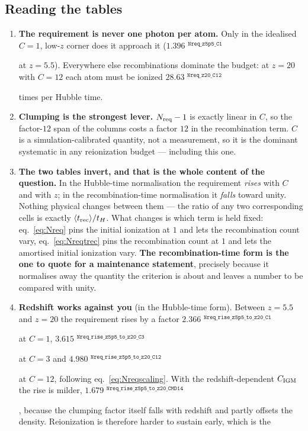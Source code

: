 \documentclass[11pt,a4paper]{article}
\newif\ifprovdraft
\newcommand{\src}[1]{%
  \ifprovdraft
    \ifmmode{}^{\text{\color{gray}\scriptsize\texttt{#1}}}%
    \else{\color{gray}\scriptsize$^{\texttt{#1}}$}%
    \fi
  \fi}
\begin{document}
\subsection{Reading the tables}
\begin{enumerate}\itemsep3pt
\item \textbf{The requirement is never one photon per atom.} Only in the
      idealised $C=1$, low-$z$ corner does it approach it
      ($1.396$\src{Nreq\_z5p5\_C1} at $z=5.5$). Everywhere else recombinations
      dominate the budget: at $z=20$ with $C=12$ each atom must be ionized
      $28.63$\src{Nreq\_z20\_C12} times per Hubble time.
\item \textbf{Clumping is the strongest lever.} $N_{\rm req}-1$ is exactly
      linear in $C$, so the factor-$12$ span of the columns costs a factor $12$
      in the recombination term. $C$ is a simulation-calibrated quantity, not a
      measurement, so it is the dominant systematic in any reionization budget
      --- including this one.
\item \textbf{The two tables invert, and that is the whole content of the
      question.} In the Hubble-time normalisation the requirement \emph{rises}
      with $C$ and with $z$; in the recombination-time normalisation it
      \emph{falls} toward unity. Nothing physical changes between them --- the
      ratio of any two corresponding cells is exactly
      $\langle t_{\rm rec}\rangle/t_H$. What changes is which term is held
      fixed: eq.~\eqref{eq:Nreq} pins the initial ionization at $1$ and lets the
      recombination count vary, eq.~\eqref{eq:Nreqtrec} pins the recombination
      count at $1$ and lets the amortised initial ionization vary.
      \textbf{The recombination-time form is the one to quote for a maintenance
      statement}, precisely because it normalises away the quantity the
      criterion is about and leaves a number to be compared with unity.
\item \textbf{Redshift works against you} (in the Hubble-time form). Between
      $z=5.5$ and $z=20$ the
      requirement rises by a factor
      $2.366$\src{Nreq\_rise\_z5p5\_to\_z20\_C1} at $C=1$,
      $3.615$\src{Nreq\_rise\_z5p5\_to\_z20\_C3} at $C=3$ and
      $4.980$\src{Nreq\_rise\_z5p5\_to\_z20\_C12} at $C=12$, following
      eq.~\eqref{eq:Nreqscaling}. With the redshift-dependent $C_{\rm IGM}$ the
      rise is milder,
      $1.679$\src{Nreq\_rise\_z5p5\_to\_z20\_CMD14}, because the clumping factor
      itself falls with redshift and partly offsets the density.
      Reionization is therefore harder to sustain early, which is the

\end{enumerate}
\end{document}

